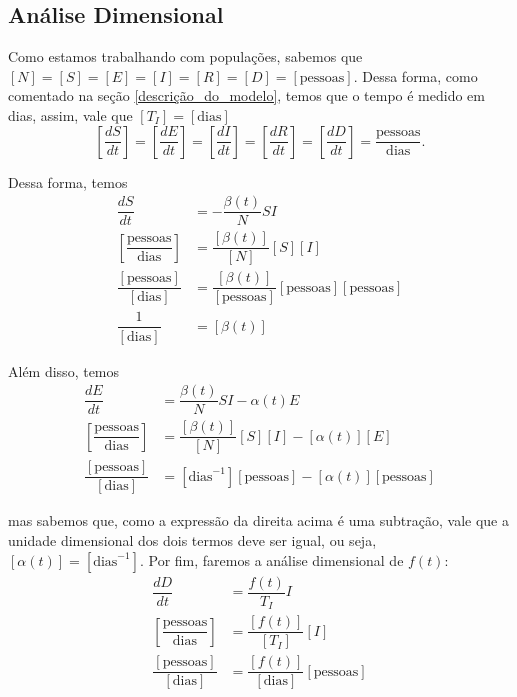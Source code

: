 \documentclass{article}
\begin{document}
\subsection{Análise Dimensional} \label{analise_dimensional}

Como estamos trabalhando com populações, sabemos que $[N] = [S] = [E] = [I] = [R] = [D] = [\text{pessoas}]$. Dessa forma, como comentado na seção \ref{descrição_do_modelo}, temos que o tempo é medido em dias, assim, vale que $[T_I] = [\text{dias}]$
\[\left[\dfrac{dS}{dt}\right] = \left[\dfrac{dE}{dt}\right] = \left[\dfrac{dI}{dt}\right] = \left[\dfrac{dR}{dt}\right] = \left[\dfrac{dD}{dt}\right] = \dfrac{\text{pessoas}}{\text{dias}}.\]

Dessa forma, temos
\begin{equation*}
    \begin{split}
        \dfrac{dS}{dt} & = -\dfrac{\beta(t)}{N}SI \\
        \left[\dfrac{\text{pessoas}}{\text{dias}}\right] & = \dfrac{[\beta(t)]}{[N]}[S][I] \\
        \dfrac{[\text{pessoas}]}{[\text{dias}]} & = \dfrac{[\beta(t)]}{[\text{pessoas}]}[\text{pessoas}][\text{pessoas}] \\
        \dfrac{1}{[\text{dias}]} & = [\beta(t)]
    \end{split}
\end{equation*}

Além disso, temos
\begin{equation*}
    \begin{split}
        \dfrac{dE}{dt} & = \dfrac{\beta(t)}{N}SI - \alpha(t) E \\
        \left[\dfrac{\text{pessoas}}{\text{dias}}\right] & = \dfrac{[\beta(t)]}{[N]}[S][I] - [\alpha(t)][E] \\
        \dfrac{[\text{pessoas}]}{[\text{dias}]} & = [\text{dias}^{-1}][\text{pessoas}] - [\alpha(t)][\text{pessoas}]
    \end{split}
\end{equation*}

\noindent mas sabemos que, como a expressão da direita acima é uma subtração, vale que a unidade dimensional dos dois termos deve ser igual, ou seja, $[\alpha(t)] = [\text{dias}^{-1}]$. Por fim, faremos a análise dimensional de $f(t)$:
\begin{equation*}
    \begin{split}
        \dfrac{dD}{dt} & = \dfrac{f(t)}{T_I}I \\
        \left[\dfrac{\text{pessoas}}{\text{dias}}\right] & = \dfrac{[f(t)]}{[T_I]}[I] \\
        \dfrac{[\text{pessoas}]}{[\text{dias}]} & = \dfrac{[f(t)]}{[\text{dias}]}[\text{pessoas}]
    \end{split}
\end{equation*}
\end{document}
